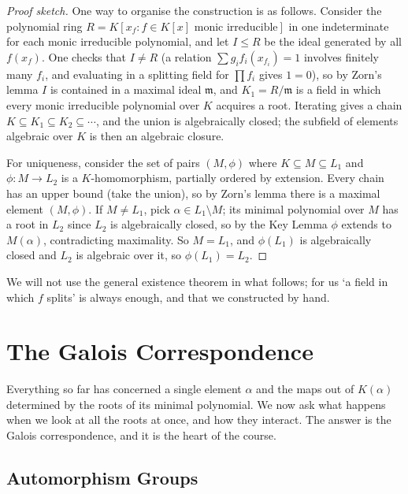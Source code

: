 \documentclass[a4paper]{scrartcl}
\begin{document}
\begin{proof}[Proof sketch]
	One way to organise the construction is as follows. Consider the polynomial ring $R = K[x_f : f \in K[x] \text{ monic irreducible}]$ in one indeterminate for each monic irreducible polynomial, and let $I \leq R$ be the ideal generated by all $f(x_f)$. One checks that $I \neq R$ (a relation $\sum g_i f_i(x_{f_i}) = 1$ involves finitely many $f_i$, and evaluating in a splitting field for $\prod f_i$ gives $1 = 0$), so by Zorn's lemma $I$ is contained in a maximal ideal $\mathfrak m$, and $K_1 = R/\mathfrak m$ is a field in which every monic irreducible polynomial over $K$ acquires a root. Iterating gives a chain $K \subseteq K_1 \subseteq K_2 \subseteq \cdots$, and the union is algebraically closed; the subfield of elements algebraic over $K$ is then an algebraic closure.

	For uniqueness, consider the set of pairs $(M, \phi)$ where $K \subseteq M \subseteq L_1$ and $\phi : M \to L_2$ is a $K$-homomorphism, partially ordered by extension. Every chain has an upper bound (take the union), so by Zorn's lemma there is a maximal element $(M,\phi)$. If $M \neq L_1$, pick $\alpha \in L_1 \setminus M$; its minimal polynomial over $M$ has a root in $L_2$ since $L_2$ is algebraically closed, so by the Key Lemma $\phi$ extends to $M(\alpha)$, contradicting maximality. So $M = L_1$, and $\phi(L_1)$ is algebraically closed and $L_2$ is algebraic over it, so $\phi(L_1) = L_2$.
\end{proof}

We will not use the general existence theorem in what follows; for us `a field in which $f$ splits' is always enough, and that we constructed by hand.

\section{The Galois Correspondence}\label{sec:galois}

Everything so far has concerned a single element $\alpha$ and the maps out of $K(\alpha)$ determined by the roots of its minimal polynomial. We now ask what happens when we look at all the roots at once, and how they interact. The answer is the Galois correspondence, and it is the heart of the course.

\subsection{Automorphism Groups}
\end{document}
